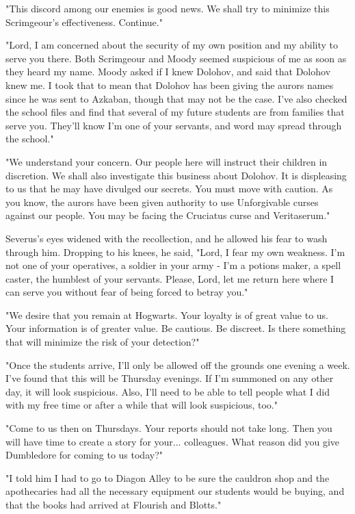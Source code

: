 "This discord among our enemies is good news. We shall try to minimize this Scrimgeour's effectiveness. Continue."

"Lord, I am concerned about the security of my own position and my ability to serve you there. Both Scrimgeour and Moody seemed suspicious of me as soon as they heard my name. Moody asked if I knew Dolohov, and said that Dolohov knew me. I took that to mean that Dolohov has been giving the aurors names since he was sent to Azkaban, though that may not be the case. I've also checked the school files and find that several of my future students are from families that serve you. They'll know I'm one of your servants, and word may spread through the school."

"We understand your concern. Our people here will instruct their children in discretion. We shall also investigate this business about Dolohov. It is displeasing to us that he may have divulged our secrets. You must move with caution. As you know, the aurors have been given authority to use Unforgivable curses against our people. You may be facing the Cruciatus curse and Veritaserum."

Severus's eyes widened with the recollection, and he allowed his fear to wash through him. Dropping to his knees, he said, "Lord, I fear my own weakness. I'm not one of your operatives, a soldier in your army - I'm a potions maker, a spell caster, the humblest of your servants. Please, Lord, let me return here where I can serve you without fear of being forced to betray you."

"We desire that you remain at Hogwarts. Your loyalty is of great value to us. Your information is of greater value. Be cautious. Be discreet. Is there something that will minimize the risk of your detection?"

"Once the students arrive, I'll only be allowed off the grounds one evening a week. I've found that this will be Thursday evenings. If I'm summoned on any other day, it will look suspicious. Also, I'll need to be able to tell people what I did with my free time or after a while that will look suspicious, too."

"Come to us then on Thursdays. Your reports should not take long. Then you will have time to create a story for your... colleagues. What reason did you give Dumbledore for coming to us today?"

"I told him I had to go to Diagon Alley to be sure the cauldron shop and the apothecaries had all the necessary equipment our students would be buying, and that the books had arrived at Flourish and Blotts."

